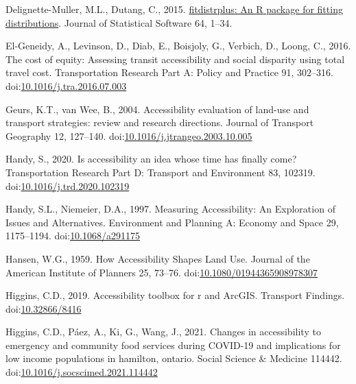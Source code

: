 \documentclass[]{elsarticle} %
\newlength{\cslhangindent}
\newlength{\cslentryspacingunit} %
\newenvironment{CSLReferences}[2] %
 {%
  \setlength{\parindent}{0pt}
  \ifodd #1
  \let\oldpar\par
  \def\par{\hangindent=\cslhangindent\oldpar}
  \fi
  \setlength{\parskip}{#2\cslentryspacingunit}
 }%
 {}
\begin{document}
\begin{CSLReferences}{1}{0}
\leavevmode{}%
Delignette-Muller, M.L., Dutang, C., 2015.
\href{https://www.jstatsoft.org/article/view/v064i04}{{fitdistrplus}: An
{R} package for fitting distributions}. Journal of Statistical Software
64, 1--34.

\leavevmode{}%
El-Geneidy, A., Levinson, D., Diab, E., Boisjoly, G., Verbich, D.,
Loong, C., 2016. The cost of equity: {Assessing} transit accessibility
and social disparity using total travel cost. Transportation Research
Part A: Policy and Practice 91, 302--316.
doi:\href{https://doi.org/10.1016/j.tra.2016.07.003}{10.1016/j.tra.2016.07.003}

\leavevmode{}%
Geurs, K.T., van Wee, B., 2004. Accessibility evaluation of land-use and
transport strategies: review and research directions. Journal of
Transport Geography 12, 127--140.
doi:\href{https://doi.org/10.1016/j.jtrangeo.2003.10.005}{10.1016/j.jtrangeo.2003.10.005}

\leavevmode{}%
Handy, S., 2020. Is accessibility an idea whose time has finally come?
Transportation Research Part D: Transport and Environment 83, 102319.
doi:\href{https://doi.org/10.1016/j.trd.2020.102319}{10.1016/j.trd.2020.102319}

\leavevmode{}%
Handy, S.L., Niemeier, D.A., 1997. Measuring {Accessibility}: {An}
{Exploration} of {Issues} and {Alternatives}. Environment and Planning
A: Economy and Space 29, 1175--1194.
doi:\href{https://doi.org/10.1068/a291175}{10.1068/a291175}

\leavevmode{}%
Hansen, W.G., 1959. How Accessibility Shapes Land Use. Journal of the
American Institute of Planners 25, 73--76.
doi:\href{https://doi.org/10.1080/01944365908978307}{10.1080/01944365908978307}

\leavevmode{}%
Higgins, C.D., 2019. Accessibility toolbox for r and ArcGIS. Transport
Findings. doi:\href{https://doi.org/10.32866/8416}{10.32866/8416}

\leavevmode{}%
Higgins, C.D., Páez, A., Ki, G., Wang, J., 2021. Changes in
accessibility to emergency and community food services during COVID-19
and implications for low income populations in hamilton, ontario. Social
Science \& Medicine 114442.
doi:\href{https://doi.org/10.1016/j.socscimed.2021.114442}{10.1016/j.socscimed.2021.114442}


\end{CSLReferences}
\end{document}

